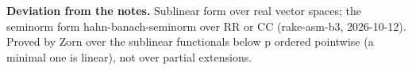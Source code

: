 %
\noindent\textbf{Deviation from the notes.} Sublinear form over real vector spaces; the seminorm form hahn-banach-seminorm over RR or CC (rake-asm-b3, 2026-10-12). Proved by Zorn over the sublinear functionals below p ordered pointwise (a minimal one is linear), not over partial extensions.
%
\renewcommand{\thethm}{Riesz-Markov (notes-63)}
\begin{thm}\label{thm:rmz-riesz-markov}
%
\leavevmode
{}

\end{thm}
